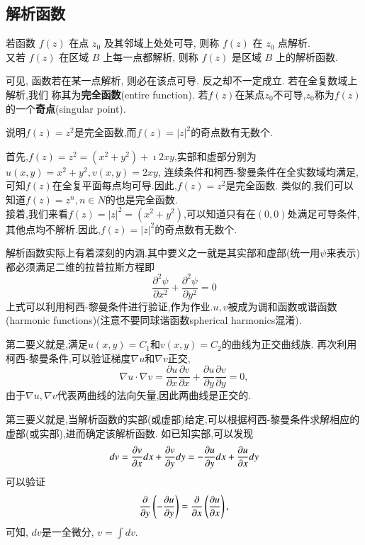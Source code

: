 \subsection{解析函数}
\begin{definition}
若函数 $f(z)$ 在点 $z_0$ 及其邻域上处处可导, 则称 $f(z)$ 在 $z_0$ 点解析.\\
 又若 $f(z)$ 在区域 $B$ 上每一点都解析, 则称 $f(z)$ 是区域 $B$ 上的解析函数.
\end{definition} 
 可见, 函数若在某一点解析, 则必在该点可导. 反之却不一定成立. 若在全复数域上解析,我们
 称其为{\bf 完全函数}(entire function).
 若$f(z)$在某点$z_0$不可导,$z_0$称为$f(z)$的一个{\bf 奇点}(singular point).

 \begin{example}
说明$f(z)=z^2$是完全函数,而$f(z)=|z|^2$的奇点数有无数个.
\end{example}
\begin{solution}
    首先,$f(z) =z^2 = (x^2 + y ^2) + \imath 2 x y$,实部和虚部分别为$u(x,y) = x^2+ y^2, v(x,y)=2x y$,
连续条件和柯西-黎曼条件在全实数域均满足,可知$f(z)$在全复平面每点均可导.因此,$f(z)=z^2$是完全函数.
类似的,我们可以知道$f(z)=z^n, n\in N$的也是完全函数.\\
    接着,我们来看$f(z) = |z|^2 = (x^2 + y ^2)$,可以知道只有在$(0,0)$处满足可导条件,其他点均不解析.因此,$f(z)=|z|^2$的奇点数有无数个.
 \end{solution}

 解析函数实际上有着深刻的内涵.其中要义之一就是其实部和虚部(统一用$\psi$来表示)都必须满足二维的拉普拉斯方程即
 \begin{equation}
    \label{eq:Laplace_eq}
    \frac{\partial^2 \psi}{\partial x^2}+\frac{\partial^2 \psi}{\partial y^2}=0
 \end{equation}
上式可以利用柯西-黎曼条件进行验证,作为作业.$u,v$被成为调和函数或谐函数(harmonic functions)(注意不要同球谐函数spherical harmonics混淆).

第二要义就是,满足$u(x,y) = C_1$和$v(x,y)= C_2$的曲线为正交曲线族.
再次利用柯西-黎曼条件,可以验证梯度$\nabla u $和$\nabla v$正交,
\begin{equation}
    \nabla u \cdot \nabla v = \frac{\partial u}{\partial x} 
    \frac{\partial v}{\partial x}+\frac{\partial u}{\partial y} \frac{\partial v}{\partial y}=0 ,
\end{equation}
由于$\nabla u, \nabla v$代表两曲线的法向矢量,因此两曲线是正交的.

第三要义就是,当解析函数的实部(或虚部)给定,可以根据柯西-黎曼条件求解相应的虚部(或实部),进而确定该解析函数.
如已知实部,可以发现
\begin{equation}
    d v = \frac{\partial{v}}{\partial{x}} dx + \frac{\partial{v}}{\partial{y}} dy = -\frac{\partial{u}}{\partial{y}} dx + \frac{\partial{u}}{\partial{x}} dy
\end{equation}
可以验证 
$$
\frac{\partial{}}{\partial{y}} \left( - \frac{\partial{u}}{\partial{y}} \right) = \frac{\partial{}}{\partial{x}} \left( \frac{\partial{u}}{\partial{x}} \right) , 
$$
可知, $dv$是一全微分, $v = \int dv$.

